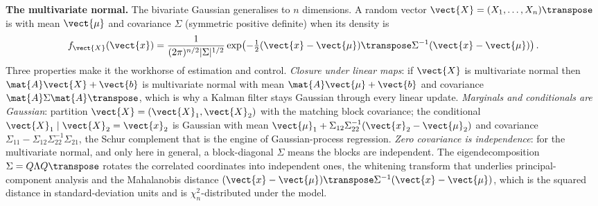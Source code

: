 \begin{mastery}
\textbf{The multivariate normal.} The bivariate Gaussian generalises
to $n$ dimensions. A random vector $\vect{X} = (X_{1}, \ldots,
X_{n})\transpose$ is  with mean
$\vect{\mu}$ and covariance $\Sigma$ (symmetric positive definite)
when its density is
\[
f_{\vect{X}}(\vect{x}) = \frac{1}{(2\pi)^{n/2} |\Sigma|^{1/2}}
\exp\!\left( -\tfrac12 (\vect{x} - \vect{\mu})\transpose
\Sigma^{-1} (\vect{x} - \vect{\mu}) \right).
\]
Three properties make it the workhorse of estimation and control.
\emph{Closure under linear maps}: if $\vect{X}$ is multivariate
normal then $\mat{A}\vect{X} + \vect{b}$ is multivariate normal with
mean $\mat{A}\vect{\mu} + \vect{b}$ and covariance $\mat{A}\Sigma
\mat{A}\transpose$, which is why a Kalman filter stays Gaussian
through every linear update. \emph{Marginals and conditionals are
Gaussian}: partition $\vect{X} = (\vect{X}_{1}, \vect{X}_{2})$ with
the matching block covariance; the conditional $\vect{X}_{1} \mid
\vect{X}_{2} = \vect{x}_{2}$ is Gaussian with mean $\vect{\mu}_{1} +
\Sigma_{12}\Sigma_{22}^{-1}(\vect{x}_{2} - \vect{\mu}_{2})$ and
covariance $\Sigma_{11} - \Sigma_{12}\Sigma_{22}^{-1}\Sigma_{21}$,
the Schur complement that is the engine of Gaussian-process
regression. \emph{Zero covariance is independence}: for the
multivariate normal, and only here in general, a block-diagonal
$\Sigma$ means the blocks are independent. The eigendecomposition
$\Sigma = Q\Lambda Q\transpose$ rotates the correlated coordinates
into independent ones, the whitening transform that underlies
principal-component analysis and the Mahalanobis distance
$(\vect{x} - \vect{\mu})\transpose\Sigma^{-1}(\vect{x} - \vect{\mu})$,
which is the squared distance in standard-deviation units and is
$\chi^{2}_{n}$-distributed under the model.
\end{mastery}

